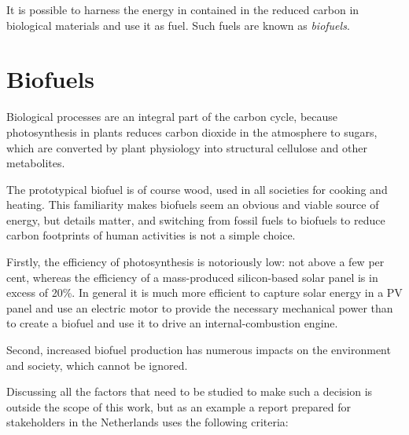 It is possible to harness the energy in contained in the reduced carbon in
biological materials and use it as fuel. Such fuels are known as
\textit{biofuels}.

\section{Biofuels}

Biological processes are an integral part of the carbon cycle, because
photosynthesis in plants reduces carbon dioxide in the atmosphere to sugars,
which are converted by plant physiology into structural cellulose and other
metabolites.

The prototypical biofuel is of course wood, used in all societies for cooking
and heating. This familiarity makes biofuels seem an obvious and viable
source of energy, but details matter, and switching from fossil fuels to
biofuels to reduce carbon footprints of human activities is not a simple choice.

Firstly, the efficiency of photosynthesis is notoriously low: not above a few
per cent, whereas the efficiency of a mass-produced silicon-based solar panel is
in excess of 20\%. In general it is much more efficient to capture solar energy
in a PV panel and use an electric motor to provide the necessary mechanical
power than to create a biofuel and use it to drive an internal-combustion
engine.
 
Second, increased biofuel production has numerous impacts on the environment and
society, which cannot be ignored.

Discussing all the factors that need to be studied to make such a decision is
outside the scope of this work, but as an example a report prepared for
stakeholders in the Netherlands \autocite{Smeets2006} uses the following criteria:

